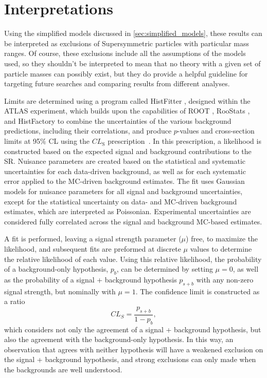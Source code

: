 
\chapter{Interpretations} %
\label{ch:interpretations} 

Using the simplified models discussed in \autoref{sec:simplified_models}, these results can be interpreted as exclusions of Supersymmetric particles with particular mass ranges. Of course, these exclusions include all the assumptions of the models used, so they shouldn't be interpreted to mean that no theory with a given set of particle masses can possibly exist, but they do provide a helpful guideline for targeting future searches and comparing results from different analyses.

Limits are determined using a program called HistFitter \cite{Baak:2014wma}, designed within the \ac{ATLAS} experiment, which builds upon the capabilities of ROOT \cite{BRUN199781}, RooStats \cite{1009.1003}, and HistFactory \cite{Cranmer:2012sba} to combine the uncertainties of the various background predictions, including their correlations, and produce $p$-values and cross-section limits at 95\% \ac{CL} using the $CL_{\text{S}}$ prescription~\cite{statforumlimits,clsread}. In this prescription, a likelihood is constructed based on the expected signal and background contributions to the \ac{SR}. Nuisance parameters are created based on the statistical and systematic uncertainties for each data-driven background, as well as for each systematic error applied to the \ac{MC}-driven background estimates. The fit uses Gaussian models for nuisance parameters for all signal and background uncertainties, except for the statistical uncertainty on data- and \ac{MC}-driven background estimates, which are interpreted as Poissonian. Experimental uncertainties are considered fully correlated across the signal and background \ac{MC}-based estimates. 

A fit is performed, leaving a signal strength parameter ($\mu$) free, to maximize the likelihood, and subsequent fits are preformed at discrete $\mu$ values to determine the relative likelihood of each value. Using this relative likelihood, the probability of a background-only hypothesis, $p_b$, can be determined by setting $\mu=0$, as well as the probability of a signal + background hypothesis $p_{s+b}$ with any non-zero signal strength, but nominally with $\mu=1$. The confidence limit is constructed as a ratio
%
\begin{equation}
CL_S = \frac{p_{s+b}}{1-p_b} , 
\end{equation}
%
which considers not only the agreement of a signal + background hypothesis, but also the agreement with the background-only hypothesis. In this way, an observation that agrees with neither hypothesis will have a weakened exclusion on the signal + background hypothesis, and strong exclusions can only made when the backgrounds are well understood.

